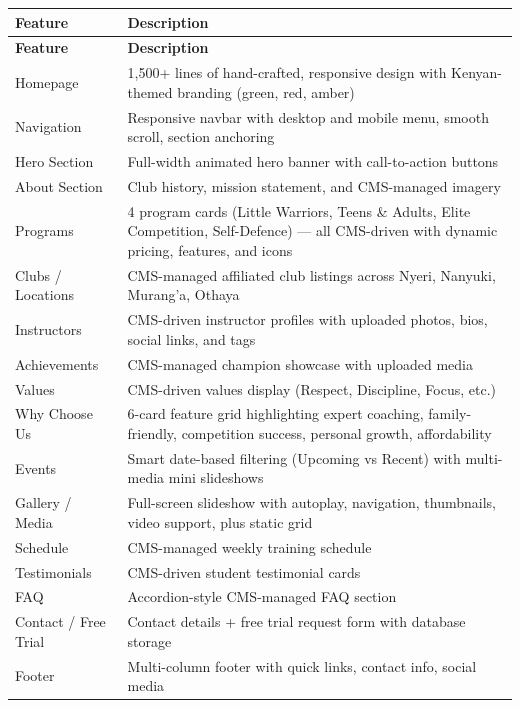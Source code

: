 \documentclass[12pt,a4paper]{article}
\begin{document}
\begin{longtable}{p{4cm}p{10cm}}
    \toprule
    \textbf{Feature} & \textbf{Description} \\
    \midrule
    \endfirsthead
    \toprule
    \textbf{Feature} & \textbf{Description} \\
    \midrule
    \endhead
    Homepage & 1,500+ lines of hand-crafted, responsive design with Kenyan-themed branding (green, red, amber) \\
    Navigation & Responsive navbar with desktop and mobile menu, smooth scroll, section anchoring \\
    Hero Section & Full-width animated hero banner with call-to-action buttons \\
    About Section & Club history, mission statement, and CMS-managed imagery \\
    Programs & 4 program cards (Little Warriors, Teens \& Adults, Elite Competition, Self-Defence) --- all CMS-driven with dynamic pricing, features, and icons \\
    Clubs / Locations & CMS-managed affiliated club listings across Nyeri, Nanyuki, Murang'a, Othaya \\
    Instructors & CMS-driven instructor profiles with uploaded photos, bios, social links, and tags \\
    Achievements & CMS-managed champion showcase with uploaded media \\
    Values & CMS-driven values display (Respect, Discipline, Focus, etc.) \\
    Why Choose Us & 6-card feature grid highlighting expert coaching, family-friendly, competition success, personal growth, affordability \\
    Events & Smart date-based filtering (Upcoming vs Recent) with multi-media mini slideshows \\
    Gallery / Media & Full-screen slideshow with autoplay, navigation, thumbnails, video support, plus static grid \\
    Schedule & CMS-managed weekly training schedule \\
    Testimonials & CMS-driven student testimonial cards \\
    FAQ & Accordion-style CMS-managed FAQ section \\
    Contact / Free Trial & Contact details + free trial request form with database storage \\
    Footer & Multi-column footer with quick links, contact info, social media \\
    \bottomrule
\end{longtable}
\end{document}
